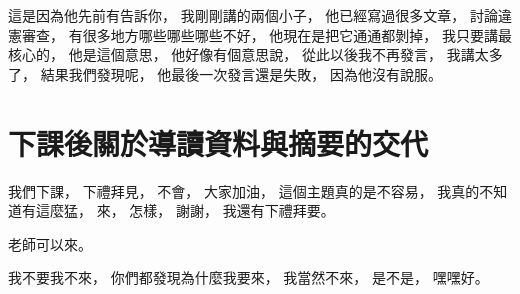 \hypertarget{w06:cue:3280}{}這是因為他先前有告訴你，
\hypertarget{w06:cue:3281}{}我剛剛講的兩個小子，
\hypertarget{w06:cue:3282}{}他已經寫過很多文章，
\hypertarget{w06:cue:3283}{}討論違憲審查，
\hypertarget{w06:cue:3284}{}有很多地方哪些哪些哪些不好，
\hypertarget{w06:cue:3285}{}他現在是把它通通都剝掉，
\hypertarget{w06:cue:3286}{}我只要講最核心的，
\hypertarget{w06:cue:3287}{}他是這個意思，
\hypertarget{w06:cue:3288}{}他好像有個意思說，
\hypertarget{w06:cue:3289}{}從此以後我不再發言，
\hypertarget{w06:cue:3290}{}我講太多了，
\hypertarget{w06:cue:3291}{}結果我們發現呢，
\hypertarget{w06:cue:3292}{}他最後一次發言還是失敗，
\hypertarget{w06:cue:3293}{}因為他沒有說服。

\section{下課後關於導讀資料與摘要的交代}

\hypertarget{w06:cue:3294}{}我們下課，
\hypertarget{w06:cue:3295}{}下禮拜見，
\hypertarget{w06:cue:3296}{}不會，
\hypertarget{w06:cue:3297}{}大家加油，
\hypertarget{w06:cue:3298}{}這個主題真的是不容易，
\hypertarget{w06:cue:3299}{}我真的不知道有這麼猛，
\hypertarget{w06:cue:3300}{}來，
\hypertarget{w06:cue:3301}{}怎樣，
\hypertarget{w06:cue:3302}{}謝謝，
\hypertarget{w06:cue:3303}{}我還有下禮拜要。

\hypertarget{w06:cue:3304}{}老師可以來。

\hypertarget{w06:cue:3305}{}我不要我不來，
\hypertarget{w06:cue:3306}{}你們都發現為什麼我要來，
\hypertarget{w06:cue:3307}{}我當然不來，
\hypertarget{w06:cue:3308}{}是不是，
\hypertarget{w06:cue:3309}{}嘿嘿好。

